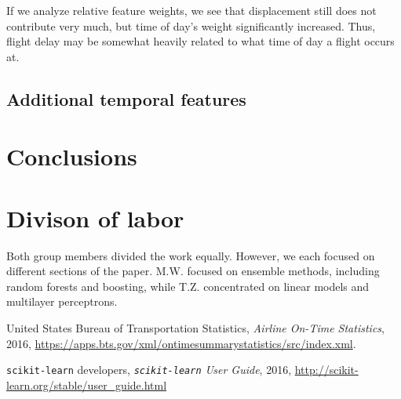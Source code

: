 \documentclass{article}
\begin{document}
\begin{multicols}{2}
If we analyze relative feature weights,
we see that displacement still does not contribute very much,
but time of day's weight significantly increased.
Thus, flight delay may be somewhat heavily related to
what time of day a flight occurs at.

\subsection{Additional temporal features}



\section{Conclusions}





\section{Divison of labor}

Both group members divided the work equally.
However, we each focused on different sections of the paper.
M.W. focused on ensemble methods, including random forests and boosting,
while T.Z. concentrated on linear models and multilayer perceptrons.

\begin{thebibliography}{4}
  United States Bureau of Transportation Statistics,
  \emph{Airline On-Time Statistics},
  2016,
  \url{https://apps.bts.gov/xml/ontimesummarystatistics/src/index.xml}.
  
  \texttt{scikit-learn} developers,
  \emph{\texttt{scikit-learn} User Guide},
  2016,
  \url{http://scikit-learn.org/stable/user_guide.html}
\end{thebibliography}


\end{multicols}
\end{document}
